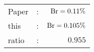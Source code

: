       \begin{tabular}{lcr}
          Paper &:& $\mathrm{Br}  = 0.11\%$ \\
          this      &:& $\mathrm{Br}  = 0.105\%$ \\
		  ratio   &:& $0.955$ \\
      \end{tabular}
